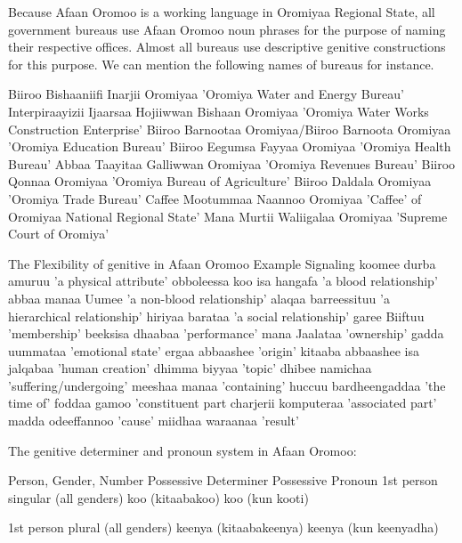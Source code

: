 \documentclass[11pt,a4paper]{article}
\begin{document}
Because Afaan Oromoo is a working language in Oromiyaa Regional State, all government bureaus use Afaan Oromoo noun phrases for the purpose of naming their respective offices. Almost all bureaus use descriptive genitive constructions for this purpose. We can mention the following names of bureaus for instance. 




	Biiroo Bishaaniifi Inarjii Oromiyaa 'Oromiya Water and Energy Bureau'	
	Interpiraayizii Ijaarsaa Hojiiwwan Bishaan Oromiyaa 'Oromiya Water Works Construction Enterprise'	
	Biiroo Barnootaa Oromiyaa/Biiroo Barnoota Oromiyaa 'Oromiya Education Bureau'
	Biiroo Eegumsa Fayyaa Oromiyaa 'Oromiya Health Bureau'
	Abbaa Taayitaa Galliwwan Oromiyaa 'Oromiya Revenues Bureau'
	Biiroo Qonnaa Oromiyaa 'Oromiya Bureau of Agriculture'
	Biiroo Daldala Oromiyaa 'Oromiya Trade Bureau'
	Caffee Mootummaa Naannoo Oromiyaa 'Caffee' of Oromiyaa National Regional State'
	Mana Murtii Waliigalaa Oromiyaa 'Supreme Court of Oromiya'
	
	
	The Flexibility of genitive in Afaan Oromoo
	Example                           Signaling
	koomee durba amuruu               'a physical attribute'
	obboleessa koo isa hangafa        'a blood relationship'
	abbaa manaa Uumee                'a non-blood relationship'
	alaqaa barreessituu              'a hierarchical relationship'
	hiriyaa barataa                  'a social relationship'
	garee Biiftuu                    'membership'
	beeksisa dhaabaa                 'performance'
	mana Jaalataa                    'ownership'
	gadda uummataa                   'emotional state'
	ergaa abbaashee                  'origin'
	kitaaba abbaashee isa jalqabaa   'human creation'
	dhimma biyyaa                   'topic'
	dhibee namichaa                'suffering/undergoing'
	meeshaa manaa                  'containing'
	huccuu bardheengaddaa          'the time of'
	foddaa gamoo                   'constituent part
	charjerii komputeraa           'associated part'
	madda odeeffannoo              'cause'
	miidhaa waraanaa               'result'
	
	
	The genitive determiner and pronoun system in Afaan Oromoo:
	
	Person, Gender, Number           Possessive Determiner             Possessive Pronoun
	1st person singular
	(all genders)                    koo (kitaabakoo)                       koo (kun kooti)
	
	1st person plural
	(all genders)                    keenya (kitaabakeenya)                keenya (kun keenyadha)
	
\end{document}
